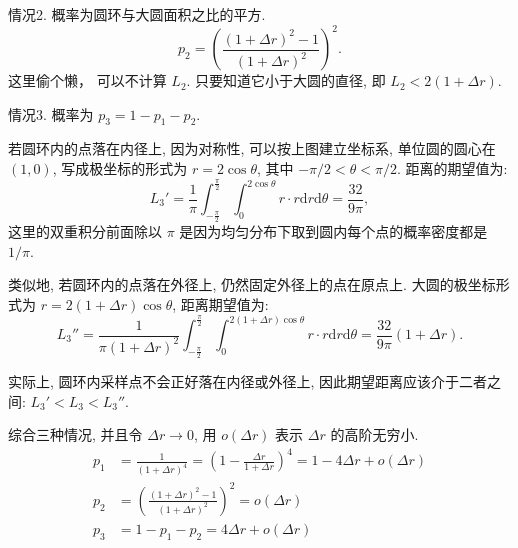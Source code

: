 情况2. 概率为圆环与大圆面积之比的平方.
\[p_2 = \left( \frac{(1+\Delta r)^2 - 1}{(1+\Delta r)^2} \right)^2 .\]
这里偷个懒， 可以不计算 $L_2$. 只要知道它小于大圆的直径, 即 $L_2 < 2(1+\Delta r)$.

情况3. 概率为 $ p_3 = 1 - p_1 - p_2 $. 

\begin{figure*}[htbp]
\centering
{}
\end{figure*}
\noindent 若圆环内的点落在内径上, 因为对称性, 可以按上图建立坐标系, 单位圆的圆心在 $(1,0)$, 写成极坐标的形式为 $r = 2\cos\theta $, 其中 $-\pi/2 < \theta < \pi/2$.
距离的期望值为:
\[ L_3'= \frac{1}{\pi}\int_{-\frac{\pi}{2}}^{\frac{\pi}{2}}\int_0^{2\cos\theta} r\cdot r\mathrm{d}r \mathrm{d}\theta = \frac{32}{9\pi},\]
这里的双重积分前面除以 $\pi$ 是因为均匀分布下取到圆内每个点的概率密度都是 $1/\pi$. 

类似地, 若圆环内的点落在外径上, 仍然固定外径上的点在原点上. 大圆的极坐标形式为 $ r = 2(1+\Delta r)\cos\theta$, 距离期望值为:
\[ L_3'' = \frac{1}{\pi(1+\Delta r)^2}\int_{-\frac{\pi}{2}}^{\frac{\pi}{2}}\int_0^{2(1+\Delta r)\cos\theta} r\cdot r\mathrm{d}r \mathrm{d}\theta = \frac{32}{9\pi}(1+\Delta r).\]

实际上, 圆环内采样点不会正好落在内径或外径上, 因此期望距离应该介于二者之间: $ L_3' < L_3 < L_3''$.

综合三种情况, 并且令 $\Delta r \rightarrow 0$, 用 $o(\Delta r)$ 表示 $\Delta r$ 的高阶无穷小.
\begin{align*}
p_1 &= \frac{1}{(1+\Delta r)^4} = \left(1-\frac{\Delta r}{1+\Delta r}\right)^4 = 1 - 4\Delta r + o(\Delta r) \\
p_2 &= \left( \frac{(1+\Delta r)^2 - 1}{(1+\Delta r)^2} \right)^2 = o(\Delta r) \\
p_3 &= 1 - p_1 - p_2 = 4\Delta r + o(\Delta r)
\end{align*}

